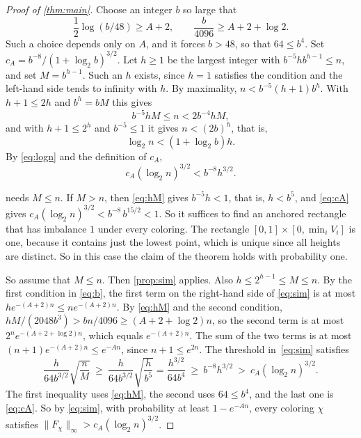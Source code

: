 \documentclass[11pt,letterpaper]{article}
\newcommand{\1}{\mathbf{1}}
\newcommand{\Fnorm}[1]{\lVert #1\rVert_\infty}
\begin{document}
\begin{proof}[Proof of \cref{thm:main}]
Choose an integer $b$ so large that
\begin{equation}\label{eq:b}
\frac12\log(b/48)\ge A+2,\qquad\frac b{4096}\ge A+2+\log2.
\end{equation}
Such a choice depends only on $A$, and it forces $b>48$, so that $64\le b^4$. Set $c_A=b^{-8}/(1+\log_2b)^{3/2}$. Let $h\ge1$ be the largest integer with $b^{-5}hb^{h-1}\le n$, and set $M=b^{h-1}$. Such an $h$ exists, since $h=1$ satisfies the condition and the left-hand side tends to infinity with $h$. By maximality, $n<b^{-5}(h+1)b^h$. With $h+1\le2h$ and $b^h=bM$ this gives
\begin{equation}\label{eq:hM}
b^{-5}hM\le n<2b^{-4}hM,
\end{equation}
and with $h+1\le2^h$ and $b^{-5}\le1$ it gives $n<(2b)^h$, that is,
\begin{equation}\label{eq:logn}
\log_2n<(1+\log_2b)h.
\end{equation}
By \eqref{eq:logn} and the definition of $c_A$,
\begin{equation}\label{eq:cA}
c_A(\log_2n)^{3/2}<b^{-8}h^{3/2}.
\end{equation}

 needs $M\le n$. If $M>n$, then \eqref{eq:hM} gives $b^{-5}h<1$, that is, $h<b^5$, and \eqref{eq:cA} gives $c_A(\log_2n)^{3/2}<b^{-8}\,b^{15/2}<1$. So it suffices to find an anchored rectangle that has imbalance $1$ under every coloring. The rectangle $[0,1]\times[0,\min_iV_i]$ is one, because it contains just the lowest point, which is unique since all heights are distinct. So in this case the claim of the theorem holds with probability one.

So assume that $M\le n$. Then \cref{prop:sim} applies. Also $h\le2^{h-1}\le M\le n$. By the first condition in \eqref{eq:b}, the first term on the right-hand side of \eqref{eq:sim} is at most $he^{-(A+2)n}\le ne^{-(A+2)n}$. By \eqref{eq:hM} and the second condition, $hM/(2048b^3)>bn/4096\ge(A+2+\log2)n$, so the second term is at most $2^ne^{-(A+2+\log2)n}$, which equals $e^{-(A+2)n}$. The sum of the two terms is at most $(n+1)e^{-(A+2)n}\le e^{-An}$, since $n+1\le e^{2n}$. The threshold in~\eqref{eq:sim} satisfies
\[
\frac h{64b^{3/2}}\sqrt{\frac nM}\ \ge\ \frac h{64b^{3/2}}\sqrt{\frac h{b^5}}=\frac{h^{3/2}}{64b^4}\ \ge\ b^{-8}h^{3/2}\ >\ c_A(\log_2n)^{3/2}.
\]
The first inequality uses \eqref{eq:hM}, the second uses $64\le b^4$, and the last one is \eqref{eq:cA}. So by \eqref{eq:sim}, with probability at least $1-e^{-An}$, every coloring $\chi$ satisfies $\Fnorm{F_\chi}>c_A(\log_2n)^{3/2}$.
\end{proof}
\end{document}
